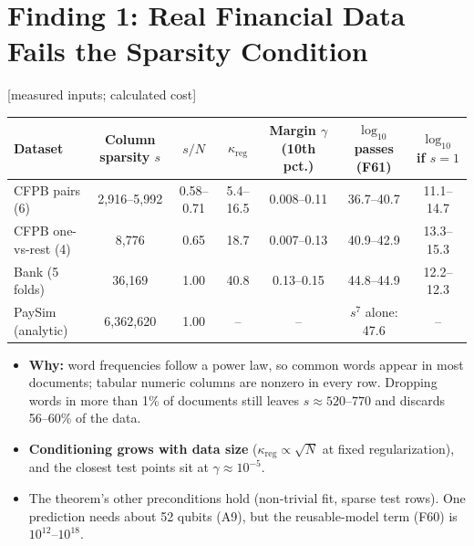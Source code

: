 \documentclass[10pt]{article}
\newcommand{\evlabel}[1]{\textsf{\small[#1]}}
\newenvironment{sectionblock}
{%
    \par
    \vspace{2pt}
    \noindent
    \begin{minipage}{\textwidth}
}
{%
    \end{minipage}
    \par
    \vspace{5pt}
}
\begin{document}
\begin{sectionblock}

\section{Finding 1: Real Financial Data Fails the Sparsity Condition}
\label{sec:f1}

\evlabel{measured inputs; calculated cost}

\vspace{2pt}
\begin{center}
\small
\begin{tabularx}{\textwidth}{@{}lCCCCCC@{}}
\toprule
\textbf{Dataset} & \textbf{Column sparsity $s$} & \textbf{$s/N$} & \textbf{$\kappa_{\mathrm{reg}}$} & \textbf{Margin $\gamma$ (10th pct.)} & \textbf{$\log_{10}$ passes (F61)} & \textbf{$\log_{10}$ if $s=1$} \\
\midrule
CFPB pairs (6) & 2{,}916--5{,}992 & 0.58--0.71 & 5.4--16.5 & 0.008--0.11 & 36.7--40.7 & 11.1--14.7 \\
CFPB one-vs-rest (4) & 8{,}776 & 0.65 & 18.7 & 0.007--0.13 & 40.9--42.9 & 13.3--15.3 \\
Bank (5 folds) & 36{,}169 & 1.00 & 40.8 & 0.13--0.15 & 44.8--44.9 & 12.2--12.3 \\
PaySim (analytic) & 6{,}362{,}620 & 1.00 & -- & -- & $s^7$ alone: 47.6 & -- \\
\bottomrule
\end{tabularx}
\end{center}

\begin{itemize}
    \item \textbf{Why:} word frequencies follow a power law, so common words appear in most documents; tabular numeric columns are nonzero in every row. Dropping words in more than 1\% of documents still leaves $s\approx 520$--$770$ and discards 56--60\% of the data.
    \item \textbf{Conditioning grows with data size} ($\kappa_{\mathrm{reg}}\propto\sqrt{N}$ at fixed regularization), and the closest test points sit at $\gamma\approx10^{-5}$.
    \item The theorem's other preconditions hold (non-trivial fit, sparse test rows). One prediction needs about 52 qubits (A9), but the reusable-model term (F60) is $10^{12}$--$10^{18}$.
\end{itemize}

\end{sectionblock}
\end{document}

